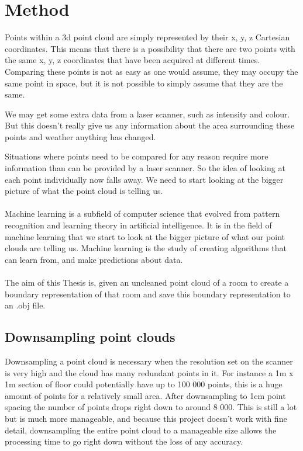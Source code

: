 
\chapter{Method}

	Points within a 3d point cloud are simply represented by their x, y, z Cartesian coordinates. This means that there is a possibility that there are two points with the same x, y, z coordinates that have been acquired at different times. Comparing these points is not as easy as one would assume, they may occupy the same point in space, but it is not possible to simply assume that they are the same.
	
	We may get some extra data from a laser scanner, such as intensity and colour. But this doesn't really give us any information about the area surrounding these points and weather anything has changed.
	
	Situations where points need to be compared for any reason require more information than can be provided by a laser scanner. So the idea of looking at each point individually now falls away. We need to start looking at the bigger picture of what the point cloud is telling us.\\
	\\
	Machine learning is a subfield of computer science that evolved from pattern recognition and learning theory in artificial intelligence. It is in the field of machine learning that we start to look at the bigger picture of what our point clouds are telling us. Machine learning is the study of creating algorithms that can learn from, and make predictions about data.\\
	\\
	The aim of this Thesis is, given an uncleaned point cloud of a room to create a boundary representation of that room and save this boundary representation to an .obj file.
	
	
\section{Downsampling point clouds}
	\label{downsample}
	Downsampling a point cloud is necessary when the resolution set on the scanner is very high and the cloud has many redundant points in it. For instance a 1m x 1m section of floor could potentially have up to 100 000 points, this is a huge amount of points for a relatively small area. After downsampling to 1cm point spacing the number of points drops right down to around 8 000. This is still a lot but is much more manageable, and because this project doesn't work with fine detail, downsampling the entire point cloud to a manageable size allows the processing time to go right down without the loss of any accuracy.
	
